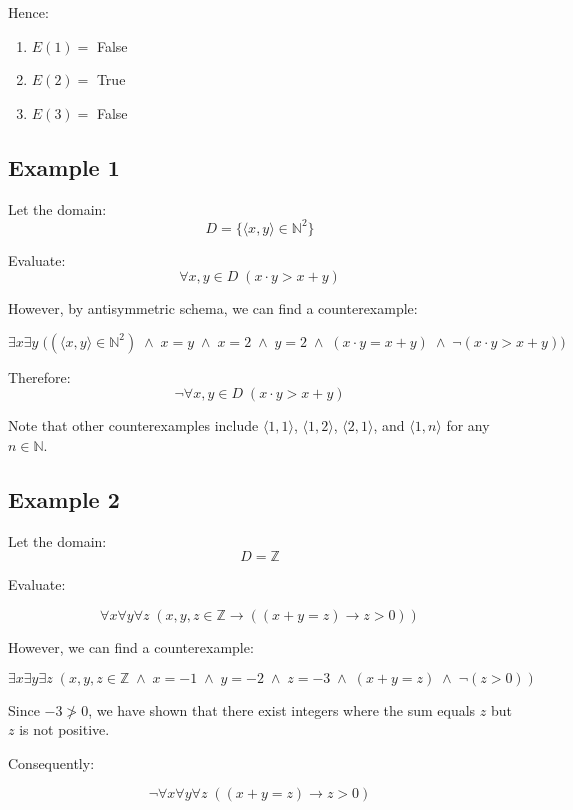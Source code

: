 \documentclass[12pt,a4paper,openany]{article}
\begin{document}
Hence:

\begin{enumerate}
  \item \(E(1) =\) False
  \item \(E(2) =\) True
  \item \(E(3) =\) False
\end{enumerate}


\subsection{Example 1}\label{example-1}

Let the domain: \[D = \{\langle x,y \rangle \in \mathbb{N}^2\}\]

Evaluate: \[\forall x,y  \in D \;(x \cdot y > x + y)\]

However, by antisymmetric schema, we can find a counterexample:

\[
\exists x \exists y \;\big((\langle x, y \rangle \in \mathbb{N}^2) \;\land\; x = y \;\land\; x = 2 \;\land\; y = 2 \;\land\; (x \cdot y = x + y) \;\land\; \neg(x \cdot y > x + y)\big)
\]

Therefore: \[\boxed{\neg \forall x,y \in D \;(x \cdot y > x + y)}\]

Note that other counterexamples include \(\langle 1,1 \rangle\),
\(\langle 1,2 \rangle\), \(\langle 2,1 \rangle\), and
\(\langle 1,n \rangle\) for any \(n \in \mathbb{N}\).

\subsection{Example 2}\label{example-2}

Let the domain: \[D = \mathbb{Z}\]

Evaluate:

\[\forall x \forall y \forall z \;(x, y, z \in \mathbb{Z} \to ((x + y = z) \to z > 0))\]

However, we can find a counterexample:

\[\exists x \exists y \exists z \;(x, y, z \in \mathbb{Z} \;\land\; x = -1 \;\land\; y = -2 \;\land\; z = -3 \;\land\; (x + y = z) \;\land\; \neg(z > 0))\]

Since \(-3 \not> 0\), we have shown that there exist integers where the
sum equals \(z\) but \(z\) is not positive.

Consequently:

\[\boxed{\neg \forall x \forall y \forall z \;((x + y = z) \to z > 0)}\]
\end{document}
